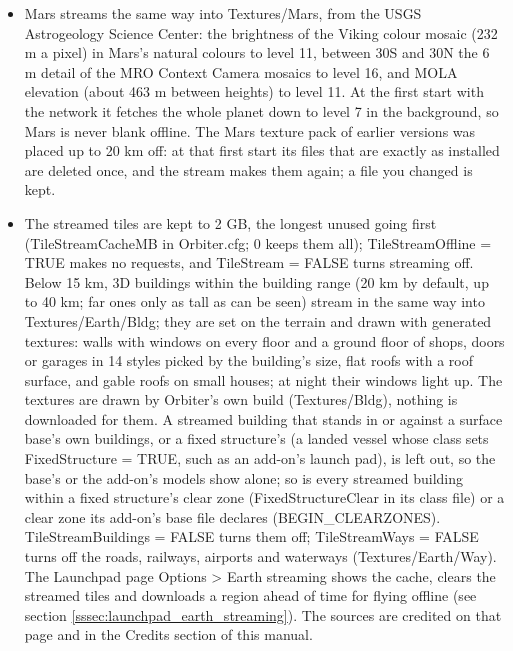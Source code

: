 \documentclass[Orbiter User Manual.tex]{subfiles}
\begin{document}
\begin{itemize}
\item Mars streams the same way into Textures/Mars, from the USGS Astrogeology Science Center: the brightness of the Viking colour mosaic (232 m a pixel) in Mars's natural colours to level 11, between 30\textdegree{}S and 30\textdegree{}N the 6 m detail of the MRO Context Camera mosaics to level 16, and MOLA elevation (about 463 m between heights) to level 11. At the first start with the network it fetches the whole planet down to level 7 in the background, so Mars is never blank offline. The Mars texture pack of earlier versions was placed up to 20 km off: at that first start its files that are exactly as installed are deleted once, and the stream makes them again; a file you changed is kept.
\item The streamed tiles are kept to 2 GB, the longest unused going first (TileStreamCacheMB in Orbiter.cfg; 0 keeps them all); TileStreamOffline = TRUE makes no requests, and TileStream = FALSE turns streaming off. Below 15 km, 3D buildings within the building range (20 km by default, up to 40 km; far ones only as tall as can be seen) stream in the same way into Textures/Earth/Bldg; they are set on the terrain and drawn with generated textures: walls with windows on every floor and a ground floor of shops, doors or garages in 14 styles picked by the building's size, flat roofs with a roof surface, and gable roofs on small houses; at night their windows light up. The textures are drawn by Orbiter's own build (Textures/Bldg), nothing is downloaded for them. A streamed building that stands in or against a surface base's own buildings, or a fixed structure's (a landed vessel whose class sets FixedStructure = TRUE, such as an add-on's launch pad), is left out, so the base's or the add-on's models show alone; so is every streamed building within a fixed structure's clear zone (FixedStructureClear in its class file) or a clear zone its add-on's base file declares (BEGIN\_CLEARZONES). TileStreamBuildings = FALSE turns them off; TileStreamWays = FALSE turns off the roads, railways, airports and waterways (Textures/Earth/Way). The Launchpad page Options > Earth streaming shows the cache, clears the streamed tiles and downloads a region ahead of time for flying offline (see section \ref{sssec:launchpad_earth_streaming}). The sources are credited on that page and in the Credits section of this manual.
\end{itemize}

\noindent
{}
\end{document}
